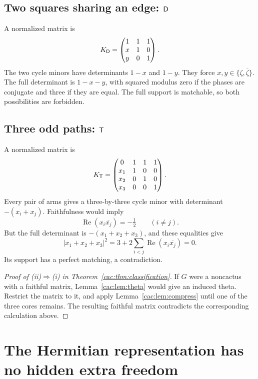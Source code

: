 \documentclass[11pt]{article}
\numberwithin{equation}{section}
\theoremstyle{definition}
\begin{document}
\subsection{Two squares sharing an edge: \texorpdfstring{$\mathsf D$}{D}}
A normalized matrix is
\begin{equation}
 K_{\mathsf D}=\begin{pmatrix}
 1&1&1\\x&1&0\\y&0&1
 \end{pmatrix}.
 \label{cac:eq:D}
\end{equation}
The two cycle minors have determinants $1-x$ and $1-y$. They force $x,y\in\{\zeta,\overline\zeta\}$. The full determinant is $1-x-y$, with squared modulus zero if the phases are conjugate and three if they are equal. The full support is matchable, so both possibilities are forbidden.

\subsection{Three odd paths: \texorpdfstring{$\mathsf T$}{T}}
A normalized matrix is
\begin{equation}
 K_{\mathsf T}=\begin{pmatrix}
 0&1&1&1\\x_1&1&0&0\\x_2&0&1&0\\x_3&0&0&1
 \end{pmatrix}.
 \label{cac:eq:T}
\end{equation}
Every pair of arms gives a three-by-three cycle minor with determinant $-(x_i+x_j)$. Faithfulness would imply
\[
 \operatorname{Re}(x_i\overline{x_j})=-\tfrac12
 \qquad(i\ne j).
\]
But the full determinant is $-(x_1+x_2+x_3)$, and these equalities give
\[
 |x_1+x_2+x_3|^2
 =3+2\sum_{i<j}\operatorname{Re}(x_i\overline{x_j})=0.
\]
Its support has a perfect matching, a contradiction.

\begin{proof}[Proof of (ii)$\Rightarrow$(i) in Theorem~\ref{cac:thm:classification}]
If $G$ were a noncactus with a faithful matrix, Lemma~\ref{cac:lem:theta} would give an induced theta. Restrict the matrix to it, and apply Lemma~\ref{cac:lem:compress} until one of the three cores remains. The resulting faithful matrix contradicts the corresponding calculation above.
\end{proof}

\section{The Hermitian representation has no hidden extra freedom}
\label{cac:sec:hermitian}
\end{document}
